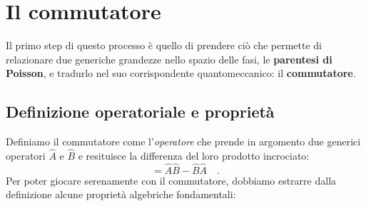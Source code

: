 \section{Il commutatore}
Il primo step di questo processo è quello di prendere ciò che permette di relazionare due generiche grandezze nello spazio delle fasi, le \textbf{parentesi di Poisson}, e tradurlo nel suo corrispondente quantomeccanico: il \textbf{commutatore}. 

\subsection{Definizione operatoriale e proprietà}
Definiamo il commutatore come l'\emph{operatore} che prende in argomento due generici operatori $\hat{A}$ e $\hat{B}$ e resituisce la differenza del loro prodotto incrociato:
\begin{equation}
    [\hat{A}, \hat{B}] = \hat{A}\hat{B} - \hat{B} \hat{A} \quad.
\end{equation}
Per poter giocare serenamente con il commutatore, dobbiamo estrarre dalla definizione alcune proprietà algebriche fondamentali:
